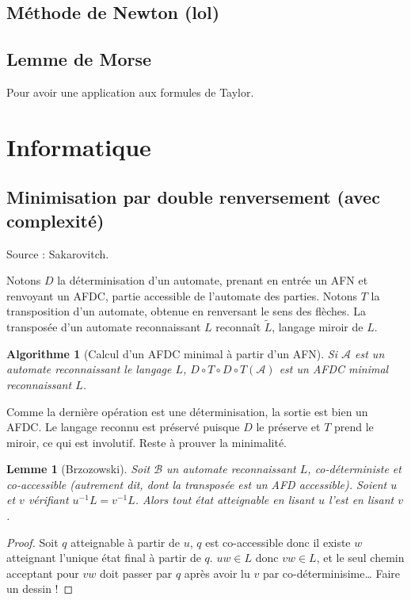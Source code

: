 \documentclass[a4paper, 11pt]{article}
\newtheorem*{algo}{Algorithme}
\newtheorem*{lemma}{Lemme}
\begin{document}
\subsection{Méthode de Newton (lol)}

\subsection{Lemme de Morse}

Pour avoir une application aux formules de Taylor.

\section{Informatique}

\subsection{Minimisation par double renversement (avec complexité)}

Source : Sakarovitch.

Notons $D$ la déterminisation d'un automate, prenant en entrée un AFN et
renvoyant un AFDC, partie accessible de l'automate des parties. Notons $T$ la
transposition d'un automate, obtenue en renversant le sens des flèches. La
transposée d'un automate reconnaissant $L$ reconnaît $\tilde{L}$, langage miroir
de $L$.

\begin{algo}[Calcul d'un AFDC minimal à partir d'un AFN]
  Si $\mathcal{A}$ est un automate reconnaissant le langage $L$, $D \circ T
  \circ D \circ T(\mathcal{A})$ est un AFDC minimal reconnaissant $L$.
\end{algo}

Comme la dernière opération est une déterminisation, la sortie est bien un AFDC.
Le langage reconnu est préservé puisque $D$ le préserve et $T$ prend le miroir,
ce qui est involutif. Reste à prouver la minimalité.

\begin{lemma}[Brzozowski]
  Soit $\mathcal{B}$ un automate reconnaissant $L$, \emph{co-déterministe} et
  \emph{co-accessible} (autrement dit, dont la transposée est un AFD
  accessible). Soient $u$ et $v$ vérifiant $u^{-1}L = v^{-1}L$. Alors tout état
  atteignable en lisant $u$ l'est en lisant $v$.
\end{lemma}
\begin{proof}
  Soit $q$ atteignable à partir de $u$, $q$ est co-accessible donc il existe $w$
  atteignant l'unique état final à partir de $q$. $uw \in L$ donc $vw \in L$, et
  le seul chemin acceptant pour $vw$ doit passer par $q$ après avoir lu $v$ par
  co-déterminisime… Faire un dessin !
\end{proof}
\end{document}
